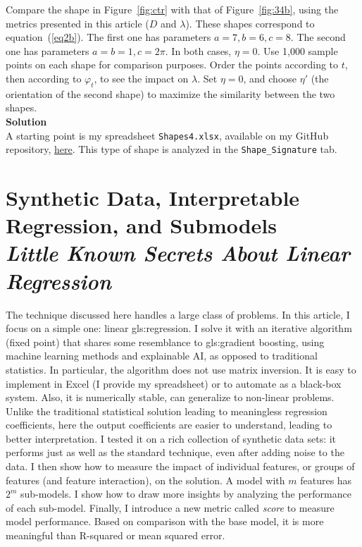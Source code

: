\documentclass[oneside,10pt]{book}
\newcommand\Chapter[2]{
  \chapter[#1]{#1\\[2ex]\Large\itshape#2}
}
\begin{document}
\begin{Exercise}Compare the shape in Figure~\ref{fig:ctr} with that of Figure~\ref{fig:34b}, using the metrics presented in this article ($D$ and $\lambda$). These shapes correspond to equation~(\ref{eq2b}). The first one has parameters $a=7,b=6,c=8$. The second one has parameters $a=b=1,c=2\pi$. In both cases, $\eta=0$. Use 1,000 sample points on each shape for comparison purposes. Order the points according to $t$, then according to $\varphi_t$, to see the impact on $\lambda$. Set $\eta=0$, and choose $\eta'$ (the orientation of the second shape) to maximize the similarity between the two shapes. \vspace{1ex} \\
{\bf Solution} \vspace{1ex} \\
A starting point is my spreadsheet \texttt{Shapes4.xlsx}, available on my GitHub repository, \href{https://github.com/VincentGranville/Machine-Learning/blob/main/Spreadsheets/README.md}{here}. This type of shape is analyzed in the \texttt{Shape\_Signature} tab.
\end{Exercise}

\Chapter{Synthetic Data, Interpretable Regression, and Submodels}{Little Known Secrets About Linear Regression}\label{chapterregression}

The technique discussed here handles a large class of problems. In this article, I focus on a simple one: linear \gls{gls:regression}. I solve it with an iterative algorithm (fixed point) that shares some resemblance to \gls{gls:gradient} boosting, using machine learning methods and explainable AI, as opposed to traditional statistics. In particular, the algorithm does not use matrix inversion. It is easy to implement in Excel (I provide my spreadsheet) or to automate as a black-box system. Also, it is numerically stable, can generalize to non-linear problems. Unlike the traditional statistical solution leading to meaningless regression coefficients, here the output coefficients are easier to understand, leading to better interpretation. I tested it on a rich collection of synthetic data sets: it performs just as well as the standard technique, even after adding noise to the data. I then show how to measure the impact of individual features, or groups of features (and feature interaction), on the solution. A model with $m$ features has $2^m$ sub-models. I show how to draw more insights by analyzing the performance of each sub-model. Finally, I introduce a new metric called {\em score} to measure model performance. Based on comparison with the base model, it is more meaningful than R-squared or mean squared error.
\end{document}
